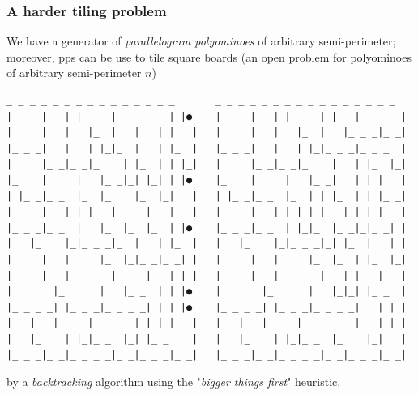 \documentclass[9pt]{beamer}
\begin{document}
\begin{frame}[fragile]
\frametitle{A harder tiling problem}
We have a generator of \textit{parallelogram polyominoes} of arbitrary
semi-perimeter; moreover, pps can be use to tile square boards (an
open problem for polyominoes of arbitrary semi-perimeter $n$)
\begin{Verbatim}[baselinestretch=0.1, fontsize=\footnotesize]
 _ _ _ _ _ _ _ _ _ _ _ _ _ _ _       _ _ _ _ _ _ _ _ _ _ _ _ _ _ _ _
|     |   | |_    |_ _ _ _ _| |●    |     |   | |_    | |_  |_ _    |
|     |   |   |_  |   |   | |   |   |     |   |   |_  |   |_ _ _|_ _|
|_ _ _|   |   | |_|_  |   | |_  |   |_ _ _|   |   | |_|_ _ _|_ _ _  |
|     |_ _|_ _|_    | |_  | | |_|   |     |_ _|_ _|_    |   | |_  |_|
|_    |     |   |_ _|_| |_| | |●    |_    |     |   |_ _|   | | |   |
| |_ _|_ _  |_  |_    |_  |_|   |   | |_ _|_ _  |_  | | |_  | | |_ _|
|     |   |_| |_ _|_ _ _|_ _|_ _|   |     |   |_| | | |_  |_| | |_  |
|_ _ _|_ _  |   |_  |_  |_  | |●    |_ _ _|_ _  | |_|_  |_ _|_|_ _| |
|   |_    |_|_ _ _|_  |   | |_  |   |   |_    |_|_ _ _|_| |_  |   | |
|     |   |     |_  |_|_ _|_ _| |   |     |   |     |_  |_  | |_  |_|
|_ _ _|_ _|_ _ _ _|_ _ _|_  | |_|   |_ _ _|_ _|_ _ _ _|_  | |_ _|_ _|
|       |_      |   |_ _  | | |●    |       |_      |   |_|_| |_ _  |
|_ _ _ _| |_ _ _|_ _ _ _| | | |●    |_ _ _ _| |_ _ _|_ _ _ _|   | | |
|   |   |_ _  |_ _ _  | |_|_|_ _|   |   |   |_ _  |_ _ _ _ _|_  | |_|
|   |_    | |_|_ _  |_| |_ _    |   |   |_    | |_|_ _  |_    |_|   |
|_ _ _|_ _|_ _ _ _|_ _|_ _ _|_ _|   |_ _ _|_ _|_ _ _ _|_ _|_ _ _|_ _|
\end{Verbatim}
by a \textit{backtracking} algorithm using the "\textit{bigger things first}"
heuristic.
\end{frame}
\end{document}
